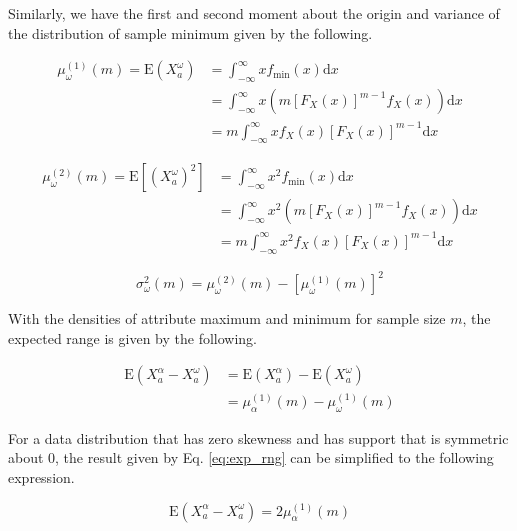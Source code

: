 \documentclass[10pt,letterpaper]{article}\usepackage[]{graphicx}\usepackage[]{color}
\begin{document}
Similarly, we have the first and second moment about the origin and variance of the distribution of sample minimum given by the following.

\begin{equation}\label{eq:mu_min}
\begin{aligned}
\mu^{(1)}_\omega(m) = \text{E}(X^\omega_a) &= \int_{-\infty}^{\infty}x f_\text{min}(x)\text{d}x \\
&= \int_{-\infty}^{\infty}x \left(m [F_X(x)]^{m-1} f_X(x)\right)\text{d}x \\
&= m \int_{-\infty}^{\infty}x f_X(x) [F_X(x)]^{m-1}\text{d}x
\end{aligned}
\end{equation}

\begin{equation}\label{eq:mu2_min}
\begin{aligned}
\mu^{(2)}_\omega(m) = \text{E}[(X^\omega_a)^2] &= \int_{-\infty}^{\infty}x^2 f_\text{min}(x)\text{d}x \\
&= \int_{-\infty}^{\infty}x^2 \left(m [F_X(x)]^{m-1} f_X(x)\right)\text{d}x \\
&= m \int_{-\infty}^{\infty}x^2 f_X(x) [F_X(x)]^{m-1}\text{d}x
\end{aligned}
\end{equation}

\begin{equation}\label{eq:sig_min}
\sigma^2_\omega(m) = \mu^{(2)}_\omega(m) - \left[\mu^{(1)}_\omega(m)\right]^2
\end{equation}

With the densities of attribute maximum and minimum for sample size $m$, the expected range is given by the following.

\begin{equation}\label{eq:exp_rng}
\begin{aligned}
\text{E}(X^\alpha_a - X^\omega_a) &= \text{E}(X^\alpha_a) - \text{E}(X^\omega_a) \\
&= \mu^{(1)}_\alpha(m) - \mu^{(1)}_\omega(m)
\end{aligned}
\end{equation}

For a data distribution that has zero skewness and has support that is symmetric about 0, the result given by Eq. \ref{eq:exp_rng} can be simplified to the following expression.

\begin{equation}\label{eq:exp_rng_symm}
\text{E}(X^\alpha_a - X^\omega_a) = 2 \mu^{(1)}_\alpha(m)
\end{equation}
\end{document}

